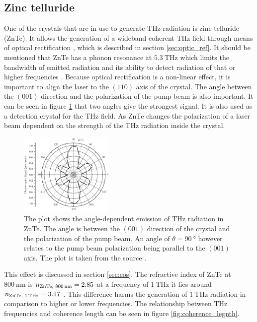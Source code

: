 \subsection{Zinc telluride}
\label{sec:znte}
One of the crystals that are in use to generate $\si{\tera\hertz}$ radiation is zinc telluride (ZnTe). 
It allows the generation of a wideband coherent $\si{\tera\hertz}$ field through means of optical rectification \cite{ZnTe_Nahata_Weling_1996}, which is described in section \ref{sec:optic_ref}.
It should be mentioned that ZnTe has a phonon resonance at $\SI{5.3}{\tera\hertz}$ which limits the bandwidth of emitted radiation and its ability to detect radiation of that or higher frequencies \cite{phonon_modes}.
Because optical rectification is a non-linear effect, it is important to align the laser to the $(110)$ axis of the crystal.
The angle between the $(001)$ direction and the polarization of the pump beam is also important.
It can be seen in figure \ref{fig:polarization_dependence_angle} that two angles give the strongest signal.
It is also used as a detection crystal for the $\si{\tera\hertz}$ field.
As ZnTe changes the polarization of a laser beam dependent on the strength of the $\si{\tera\hertz}$ radiation inside the crystal.\FloatBarrier
\begin{figure}
    \centering
    \includegraphics[width=0.4\textwidth]{refferenced_pic/degreedepenceZnTe.png}
    \caption{The plot shows the angle-dependent emission of $\si{\tera\hertz}$ radiation in ZnTe.
    The angle is between the $(001)$ direction of the crystal and the polarization of the pump beam. An angle of $\theta = \SI{90}{\degree}$ however relates to the pump beam polarization being parallel to the $(001)$ axis.
    The plot is taken from the source \cite{selig}.}
    \label{fig:polarization_dependence_angle}
\end{figure} \FloatBarrier
This effect is discussed in section \ref{sec:eos}.
The refractive index of ZnTe at $\SI{800}{\nano\meter}$ is $n_\text{ZnTe, 800\,nm} = 2.85$ \cite{refractive_index_znte} at a frequency of $\SI{1}{\tera\hertz}$ it lies around  $n_\text{ZnTe, 1\,THz} = 3.17$ \cite{hebling2004tunable}.
This difference harms the generation of $\SI{1}{\tera\hertz}$ radiation in comparison to higher or lower frequencies.
The relationship between $\si{\tera\hertz}$ frequencies and coherence length can be seen in figure \ref{fig:coherence_legnth}.
